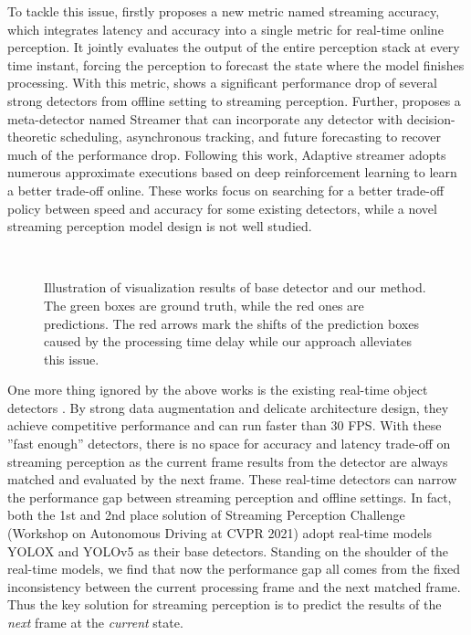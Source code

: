 \documentclass[10pt,twocolumn,letterpaper]{article}
\begin{document}
To tackle this issue, \cite{streamer} firstly proposes a new metric named streaming accuracy, which integrates latency and accuracy into a single metric for real-time online perception. It jointly evaluates the output of the entire perception stack at every time instant, forcing the perception to forecast the state where the model finishes processing. 
With this metric, \cite{streamer} shows a significant performance drop of several strong detectors \cite{htc,retinanet,maskrcnn} from offline setting to streaming perception. Further, \cite{streamer} proposes a meta-detector named Streamer that can incorporate any detector with decision-theoretic scheduling, asynchronous tracking, and future forecasting to recover much of the performance drop. 
Following this work, Adaptive streamer\cite{adaptivestreamer} adopts numerous approximate executions based on deep reinforcement learning to learn a better trade-off online. 
These works focus on searching for a better trade-off policy between speed and accuracy for some existing detectors, while a novel streaming perception model design is not well studied. 

\begin{figure}[t]      
\captionsetup[subfigure]{skip = 0pt}      
\centering      
{}\ \      
\ \      
\caption{Illustration of visualization results of base detector and our method. The green boxes are ground truth, while the red ones are predictions. The red arrows mark the shifts of the prediction boxes caused by the processing time delay while our approach alleviates this issue.}      
\label{fig:fig1}      
\vspace{-0.1in}  
\end{figure}

One more thing ignored by the above works is the existing real-time object detectors \cite{yolo5, yolox}. By strong data augmentation and delicate architecture design, they achieve competitive performance and can run faster than 30 FPS.
With these ''fast enough'' detectors, there is no space for accuracy and latency trade-off on streaming perception as the current frame results from the detector are always matched and evaluated by the next frame. These real-time detectors can narrow the performance gap between streaming perception and offline settings. In fact, both the 1st \cite{yoloxx} and 2nd \cite{2nd} place solution of Streaming Perception Challenge (Workshop on Autonomous Driving at CVPR 2021) adopt real-time models YOLOX \cite{yolox} and YOLOv5 \cite{yolo5} as their base detectors. 
Standing on the shoulder of the real-time models, we find that now the performance gap all comes from the fixed inconsistency between the current processing frame and the next matched frame. Thus the key solution for streaming perception is to predict the results of the \emph{next} frame at the \emph{current} state. 
\end{document}
